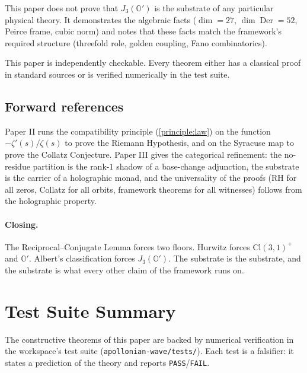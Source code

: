 \documentclass[11pt,a4paper]{article}
\theoremstyle{plain}
\theoremstyle{definition}
\theoremstyle{remark}
\numberwithin{equation}{section}
\providecommand{\Cl}{\mathrm{Cl}}
\providecommand{\Os}{\mathbb{O}'}
\DeclareMathOperator{\Der}{Der}
\begin{document}
This paper does not prove that $J_3(\Os)$ is the substrate of any
particular physical theory.  It demonstrates the algebraic facts
($\dim = 27$, $\dim\Der = 52$, Peirce frame, cubic norm) and notes
that these facts match the framework's required structure
(threefold role, golden coupling, Fano combinatorics).

This paper is independently checkable.  Every theorem either has a
classical proof in standard sources or is verified numerically in
the test suite.

\subsection*{Forward references}

Paper II runs the compatibility principle (\cref{principle:law})
on the function $-\zeta'(s)/\zeta(s)$ to prove the Riemann
Hypothesis, and on the Syracuse map to prove the Collatz
Conjecture.  Paper III gives the categorical refinement: the
no-residue partition is the rank-$1$ shadow of a base-change
adjunction, the substrate is the carrier of a holographic monad,
and the universality of the proofs (RH for all zeros, Collatz for
all orbits, framework theorems for all witnesses) follows from
the holographic property.

\paragraph{Closing.}  The Reciprocal--Conjugate Lemma forces two
floors.  Hurwitz forces $\Cl(3,1)^+$ and $\Os$.  Albert's
classification forces $J_3(\Os)$.  The substrate is the substrate,
and the substrate is what every other claim of the framework runs
on.

\section{Test Suite Summary}
\label{sec:tests}

The constructive theorems of this paper are backed by numerical
verification in the workspace's test suite
(\texttt{apollonian-wave/tests/}).  Each test is a falsifier: it
states a prediction of the theory and reports \texttt{PASS}/\texttt{FAIL}.
\end{document}
